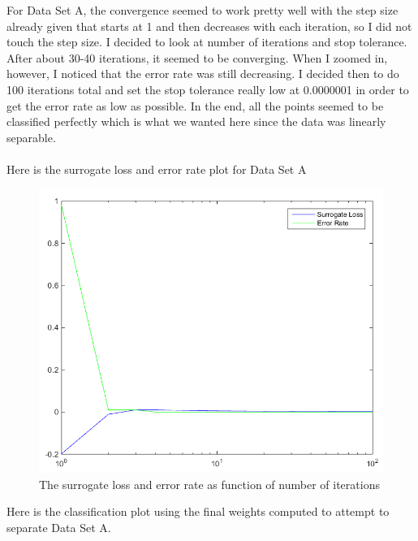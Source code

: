 \documentclass[twoside,11pt]{article}
\theoremstyle{definition}
\begin{document}
For Data Set A, the convergence seemed to work pretty well with the step size already given that starts at 1 and then decreases with each iteration, so I did not touch the step size. I decided to look at number of iterations and stop tolerance. After about 30-40 iterations, it seemed to be converging. When I zoomed in, however, I noticed that the error rate was still decreasing. I decided then to do 100 iterations total and set the stop tolerance really low at 0.0000001 in order to get the error rate as low as possible. In the end, all the points seemed to be classified perfectly which is what we wanted here since the data was linearly separable. \\
\\
Here is the surrogate loss and error rate plot for Data Set A\\
\begin{figure}[h]
\centering
\includegraphics[width=5 in]{prob1fPlotA1.png}
\caption{The surrogate loss and error rate as function of number of iterations}
\end{figure}

\newpage
Here is the classification plot using the final weights computed to attempt to separate Data Set A.\\
\end{document}
